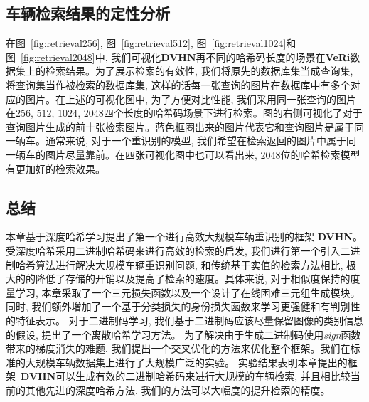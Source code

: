 \subsection{车辆检索结果的定性分析}
在图~\ref{fig:retrieval256}, 图~\ref{fig:retrieval512}, 图~\ref{fig:retrieval1024}和图~\ref{fig:retrieval2048}中, 我们可视化\textbf{DVHN}再不同的哈希码长度的场景在\textbf{VeRi}数据集上的检索结果。为了展示检索的有效性, 我们将原先的数据库集当成查询集, 将查询集当作被检索的数据库集, 这样的话每一张查询的图片在数据库中有多个对应的图片。在上述的可视化图中, 为了方便对比性能, 我们采用同一张查询的图片在$256$, $512$, $1024$, $2048$四个长度的哈希码场景下进行检索。图的右侧可视化了对于查询图片生成的前十张检索图片。蓝色框圈出来的图片代表它和查询图片是属于同一辆车。通常来说, 对于一个重识别的模型, 我们希望在检索返回的图片中属于同一辆车的图片尽量靠前。在四张可视化图中也可以看出来, $2048$位的哈希检索模型有更加好的检索效果。
\subsection{总结}
本章基于深度哈希学习提出了第一个进行高效大规模车辆重识别的框架-\textbf{DVHN}。受深度哈希采用二进制哈希码来进行高效的检索的启发, 我们进行第一个引入二进制哈希算法进行解决大规模车辆重识别问题, 和传统基于实值的检索方法相比, 极大的的降低了存储的开销以及提高了检索的速度。具体来说, 对于相似度保持的度量学习, 本章采取了一个三元损失函数以及一个设计了在线困难三元组生成模块。同时, 我们额外增加了一个基于分类损失的身份损失函数来学习更强健和有判别性的特征表示。 对于二进制码学习, 我们基于二进制码应该尽量保留图像的类别信息的假设, 提出了一个离散哈希学习方法。 为了解决由于生成二进制码使用\textit{sign}函数带来的梯度消失的难题, 我们提出一个交叉优化的方法来优化整个框架。我们在标准的大规模车辆数据集上进行了大规模广泛的实验。 实验结果表明本章提出的框架~\textbf{DVHN}可以生成有效的二进制哈希码来进行大规模的车辆检索, 并且相比较当前的其他先进的深度哈希方法, 我们的方法可以大幅度的提升检索的精度。